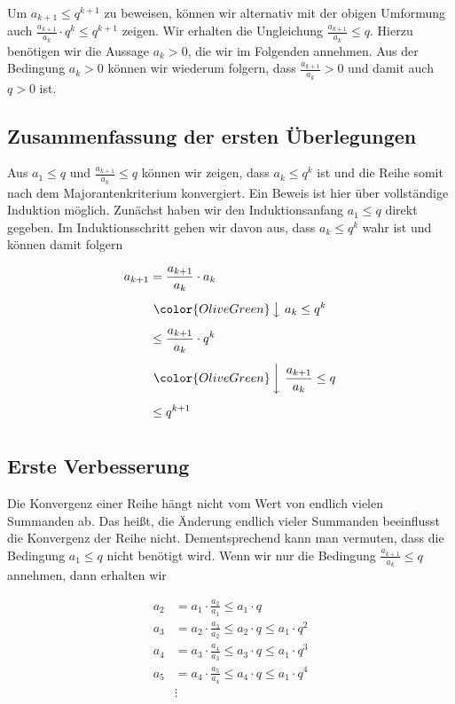 \documentclass[fontsize=9pt,
               parskip=half-,
               DIV=14,
               listof=chapterentry,
               tocflat]{scrbook}
\begin{document}
Um $a_{k+1}\leq q^{k+1}$ zu beweisen, können wir alternativ mit der obigen Umformung auch ${\tfrac {a_{k+1}}{a_{k}}}\cdot q^{k}\leq q^{k+1}$ zeigen. Wir erhalten die Ungleichung ${\tfrac {a_{k+1}}{a_{k}}}\leq q$. Hierzu benötigen wir die Aussage $a_{k}>0$, die wir im Folgenden annehmen. Aus der Bedingung $a_{k}>0$ können wir wiederum folgern, dass ${\tfrac {a_{k+1}}{a_{k}}}>0$ und damit auch $q>0$ ist.

\subsection{Zusammenfassung der ersten Überlegungen}

Aus $a_{1}\leq q$ und ${\tfrac {a_{k+1}}{a_{k}}}\leq q$ können wir zeigen, dass $a_{k}\leq q^{k}$ ist und die Reihe somit nach dem Majorantenkriterium konvergiert. Ein Beweis ist hier über vollständige Induktion möglich. Zunächst haben wir den Induktionsanfang $a_{1}\leq q$ direkt gegeben. Im Induktionsschritt gehen wir davon aus, dass $a_{k}\leq q^{k}$ wahr ist und können damit folgern

\begin{align*}
a_{k+1}&={\frac {a_{k+1}}{a_{k}}}\cdot a_{k}\\[0.5em]&\ {\color {OliveGreen}\left\downarrow \ a_{k}\leq q^{k}\right.}\\[0.5em]&\leq {\frac {a_{k+1}}{a_{k}}}\cdot q^{k}\\[0.5em]&\ {\color {OliveGreen}\left\downarrow \ {\frac {a_{k+1}}{a_{k}}}\leq q\right.}\\[0.5em]&\leq q^{k+1}\\[0.5em]
\end{align*}

\subsection{Erste Verbesserung}

Die Konvergenz einer Reihe hängt nicht vom Wert von endlich vielen Summanden ab. Das heißt, die Änderung endlich vieler Summanden beeinflusst die Konvergenz der Reihe nicht. Dementsprechend kann man vermuten, dass die Bedingung $a_{1}\leq q$ nicht benötigt wird. Wenn wir nur die Bedingung ${\tfrac {a_{k+1}}{a_{k}}}\leq q$ annehmen, dann erhalten wir

\begin{align*}
a_{2}&=a_{1}\cdot {\frac {a_{2}}{a_{1}}}\leq a_{1}\cdot q\\a_{3}&=a_{2}\cdot {\frac {a_{3}}{a_{2}}}\leq a_{2}\cdot q\leq a_{1}\cdot q^{2}\\a_{4}&=a_{3}\cdot {\frac {a_{4}}{a_{3}}}\leq a_{3}\cdot q\leq a_{1}\cdot q^{3}\\a_{5}&=a_{4}\cdot {\frac {a_{5}}{a_{4}}}\leq a_{4}\cdot q\leq a_{1}\cdot q^{4}\\&\vdots 
\end{align*}
\end{document}
